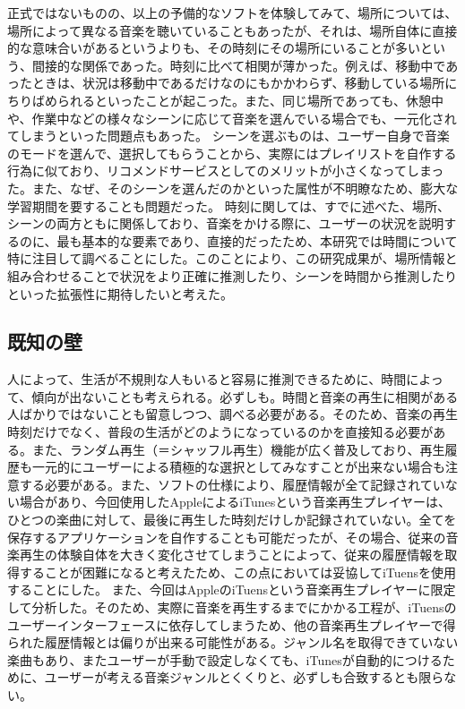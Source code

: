 \documentclass[11pt, twocolumn]{jsarticle}
\begin{document}
正式ではないものの、以上の予備的なソフトを体験してみて、場所については、場所によって異なる音楽を聴いていることもあったが、それは、場所自体に直接的な意味合いがあるというよりも、その時刻にその場所にいることが多いという、間接的な関係であった。時刻に比べて相関が薄かった。例えば、移動中であったときは、状況は移動中であるだけなのにもかかわらず、移動している場所にちりばめられるといったことが起こった。また、同じ場所であっても、休憩中や、作業中などの様々なシーンに応じて音楽を選んでいる場合でも、一元化されてしまうといった問題点もあった。
シーンを選ぶものは、ユーザー自身で音楽のモードを選んで、選択してもらうことから、実際にはプレイリストを自作する行為に似ており、リコメンドサービスとしてのメリットが小さくなってしまった。また、なぜ、そのシーンを選んだのかといった属性が不明瞭なため、膨大な学習期間を要することも問題だった。
時刻に関しては、すでに述べた、場所、シーンの両方ともに関係しており、音楽をかける際に、ユーザーの状況を説明するのに、最も基本的な要素であり、直接的だったため、本研究では時間について特に注目して調べることにした。このことにより、この研究成果が、場所情報と組み合わせることで状況をより正確に推測したり、シーンを時間から推測したりといった拡張性に期待したいと考えた。


\subsection{既知の壁}
人によって、生活が不規則な人もいると容易に推測できるために、時間によって、傾向が出ないことも考えられる。必ずしも。時間と音楽の再生に相関がある人ばかりではないことも留意しつつ、調べる必要がある。そのため、音楽の再生時刻だけでなく、普段の生活がどのようになっているのかを直接知る必要がある。また、ランダム再生（＝シャッフル再生）機能が広く普及しており、再生履歴も一元的にユーザーによる積極的な選択としてみなすことが出来ない場合も注意する必要がある。また、ソフトの仕様により、履歴情報が全て記録されていない場合があり、今回使用したAppleによるiTunesという音楽再生プレイヤーは、ひとつの楽曲に対して、最後に再生した時刻だけしか記録されていない。全てを保存するアプリケーションを自作することも可能だったが、その場合、従来の音楽再生の体験自体を大きく変化させてしまうことによって、従来の履歴情報を取得することが困難になると考えたため、この点においては妥協してiTuensを使用することにした。
また、今回はAppleのiTuensという音楽再生プレイヤーに限定して分析した。そのため、実際に音楽を再生するまでにかかる工程が、iTuensのユーザーインターフェースに依存してしまうため、他の音楽再生プレイヤーで得られた履歴情報とは偏りが出来る可能性がある。ジャンル名を取得できていない楽曲もあり、またユーザーが手動で設定しなくても、iTunesが自動的につけるために、ユーザーが考える音楽ジャンルとくくりと、必ずしも合致するとも限らない。
\end{document}
